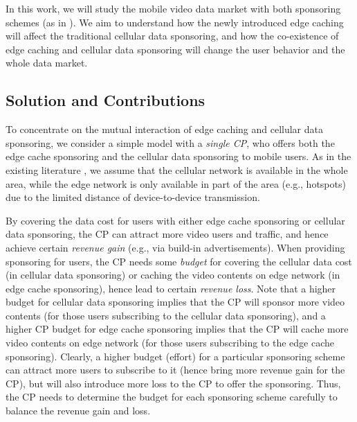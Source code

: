 In this work, we will study the mobile video data market with both sponsoring schemes (as in \cite{joint}).
We aim to understand how the newly introduced edge caching will affect the traditional cellular data sponsoring, and how the co-existence of edge caching and cellular data sponsoring will change the user behavior and the whole data market.

\iffalse
\begin{figure}[t]
	\centering
	 \texttt{[image: beijing\_map.eps]}
	 \caption{System Model.}\label{fig:architecture}	
\end{figure}
\fi


\subsection{Solution and Contributions}

To concentrate on the mutual interaction of edge caching and cellular data sponsoring, we consider a simple model with a \emph{single CP}, who offers both the edge cache sponsoring and the cellular data sponsoring to mobile users.
As in the existing literature \cite{thunder,joint, ec2}, we assume that the cellular network is available in the whole area, while the edge network is only available in part of the area (e.g., hotspots) due to the limited distance of device-to-device transmission.

By covering the data cost for users with either edge cache sponsoring or cellular data sponsoring, the CP can attract more video users and traffic, and hence achieve certain  \emph{revenue gain} (e.g., via build-in advertisements).
When providing sponsoring for users, the CP needs some \emph{budget} for covering the cellular data cost (in cellular data sponsoring) or caching the video contents on edge network (in edge cache sponsoring), hence lead to certain \emph{revenue loss}.
Note that a higher budget for cellular data sponsoring implies that the CP will sponsor more video contents (for those users subscribing to the cellular data sponsoring), and a higher CP budget for edge cache sponsoring implies that the CP will cache more video contents on edge network (for those users subscribing to the edge cache sponsoring).
Clearly, a higher budget (effort) for a particular sponsoring scheme can attract more users to subscribe to it (hence bring more revenue gain for the CP), but will also introduce more loss to the CP to offer the sponsoring.
Thus, the CP needs to determine the budget for each sponsoring scheme carefully to balance the revenue gain and loss.

